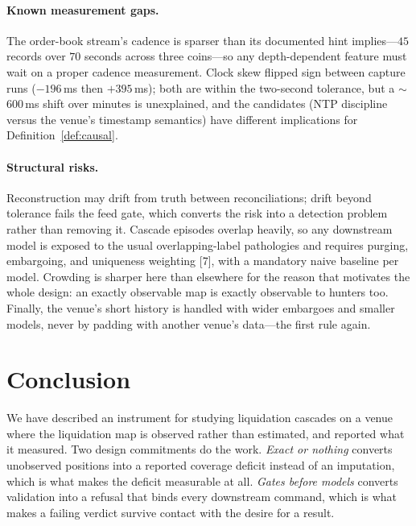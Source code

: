 \documentclass[11pt,a4paper]{article}
\theoremstyle{definition}
\theoremstyle{plain}
\begin{document}
\paragraph{Known measurement gaps.} The order-book stream's cadence is sparser than its documented
hint implies---$45$ records over $70$ seconds across three coins---so any depth-dependent feature
must wait on a proper cadence measurement. Clock skew flipped sign between capture runs ($-196$\,ms
then $+395$\,ms); both are within the two-second tolerance, but a $\sim$$600$\,ms shift over minutes
is unexplained, and the candidates (NTP discipline versus the venue's timestamp semantics) have
different implications for Definition~\ref{def:causal}.

\paragraph{Structural risks.} Reconstruction may drift from truth between reconciliations; drift
beyond tolerance fails the feed gate, which converts the risk into a detection problem rather than
removing it. Cascade episodes overlap heavily, so any downstream model is exposed to the usual
overlapping-label pathologies and requires purging, embargoing, and uniqueness weighting
[7], with a mandatory naive baseline per model. Crowding is sharper here than
elsewhere for the reason that motivates the whole design: an exactly observable map is exactly
observable to hunters too. Finally, the venue's short history is handled with wider embargoes and
smaller models, never by padding with another venue's data---the first rule again.

\section{Conclusion}
\label{sec:conclusion}

We have described an instrument for studying liquidation cascades on a venue where the liquidation
map is observed rather than estimated, and reported what it measured. Two design commitments do the
work. \emph{Exact or nothing} converts unobserved positions into a reported coverage deficit instead
of an imputation, which is what makes the deficit measurable at all. \emph{Gates before models}
converts validation into a refusal that binds every downstream command, which is what makes a failing
verdict survive contact with the desire for a result.
\end{document}

